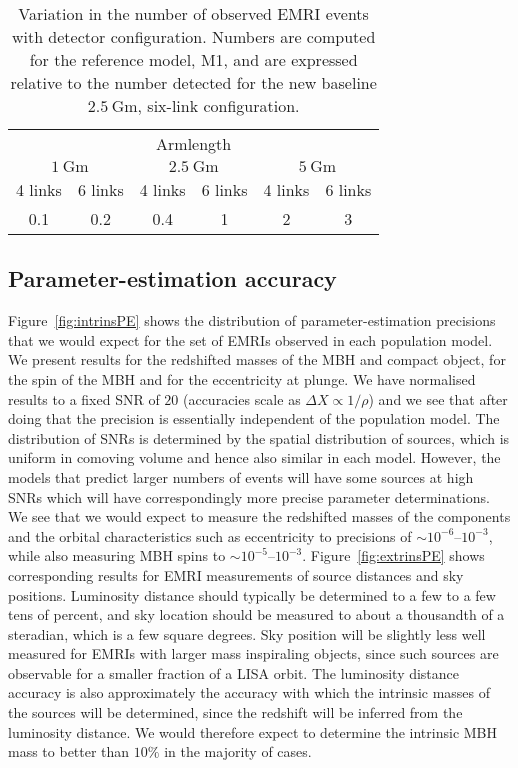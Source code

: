 \documentclass[a4paper]{jpconf}
\begin{document}
\begin{table}
\begin{center}
\begin{tabular}{cc|cc|cc}
\multicolumn{6}{c}{Armlength}\\
\multicolumn{2}{c|}{$1~\mathrm{Gm}$}&\multicolumn{2}{|c|}{$2.5~\mathrm{Gm}$}&\multicolumn{2}{|c}{$5~\mathrm{Gm}$}\\
4 links&6 links&4 links&6 links&4 links&6 links\\\hline
0.1&0.2&0.4&1&2&3
\end{tabular}
\end{center}
\caption{\label{tab:config}Variation in the number of observed EMRI events with detector configuration. Numbers are computed for the reference model, M1, and are expressed relative to the number detected for the new baseline $2.5~\mathrm{Gm}$, six-link configuration.}
\end{table}

\subsection{Parameter-estimation accuracy}
Figure~\ref{fig:intrinsPE} shows the distribution of parameter-estimation precisions that we would expect for the set of EMRIs observed in each population model. We present results for the redshifted masses of the MBH and compact object, for the spin of the MBH and for the eccentricity at plunge. We have normalised results to a fixed SNR of $20$ (accuracies scale as $\Delta X \propto 1/\rho$) and we see that after doing that the precision is essentially independent of the population model. The distribution of SNRs is determined by the spatial distribution of sources, which is uniform in comoving volume and hence also similar in each model. However, the models that predict larger numbers of events will have some sources at high SNRs which will have correspondingly more precise parameter determinations. We see that we would expect to measure the redshifted masses of the components and the orbital characteristics such as eccentricity to precisions of $\sim 10^{-6}$--$10^{-3}$, while also measuring MBH spins to $\sim10^{-5}$--$10^{-3}$. Figure~\ref{fig:extrinsPE} shows corresponding results for EMRI measurements of source distances and sky positions. Luminosity distance should typically be determined to a few to a few tens of percent, and sky location should be measured to about a thousandth of a steradian, which is a few square degrees. Sky position will be slightly less well measured for EMRIs with larger mass inspiraling objects, since such sources are observable for a smaller fraction of a LISA orbit. The luminosity distance accuracy is also approximately the accuracy with which the intrinsic masses of the sources will be determined, since the redshift will be inferred from the luminosity distance. We would therefore expect to determine the intrinsic MBH mass to better than $10\%$ in the majority of cases.
\end{document}
